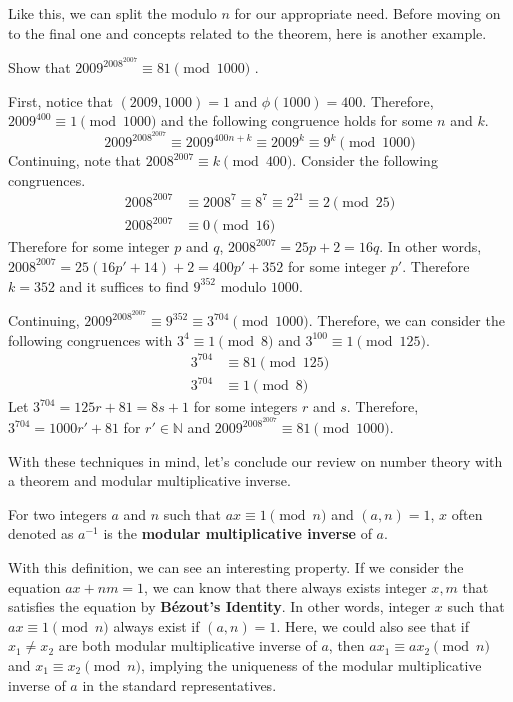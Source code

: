 \documentclass[../../../main.tex]{subfiles}
\begin{document}
Like this, we can split the modulo $n$ for our appropriate need.
Before moving on to the final one and concepts related to the
theorem, here is another example.

\begin{problem}{}{}
Show that $2009^{2008^{2007}} \equiv 81 \pmod{1000}$ \cite{MATH01-5}.
\end{problem}
\begin{solution}
First, notice that $(2009, 1000) = 1$ and $\phi(1000) = 400$.
Therefore, $2009^{400} \equiv 1 \pmod{1000}$ and the following
congruence holds for some $n$ and $k$.
\[
2009^{2008^{2007}}
\equiv 2009^{400n + k}
\equiv 2009^{k}
\equiv 9^k \pmod{1000}
\]
Continuing, note that $2008^{2007} \equiv k \pmod{400}$.
Consider the following congruences.
\begin{align*}
    2008^{2007} &\equiv 2008^7 \equiv 8^7 \equiv 2^{21}
        \equiv 2 \pmod{25} \\
    2008^{2007} &\equiv 0 \pmod{16}
\end{align*}
Therefore for some integer $p$ and $q$, $2008^{2007} = 25p + 2
= 16q$. In other words, $2008^{2007} = 25(16p' + 14) + 2
= 400p' + 352$ for some integer $p'$. Therefore $k = 352$ and
it suffices to find $9^{352}$ modulo $1000$.

Continuing, $2009^{2008^{2007}} \equiv 9^{352} \equiv 3^{704}
\pmod{1000}$. Therefore, we can consider the following congruences
with $3^4 \equiv 1 \pmod{8}$ and $3^{100} \equiv 1 \pmod{125}$.
\begin{align*}
    3^{704} &\equiv 81 \pmod{125} \\
    3^{704} &\equiv 1 \pmod{8}
\end{align*}
Let $3^{704} = 125r + 81 = 8s + 1$ for some integers $r$ and $s$.
Therefore, $3^{704} = 1000r' + 81$ for $r' \in \mathbb{N}$ and
$2009^{2008^{2007}} \equiv 81 \pmod{1000}$.
\end{solution}

With these techniques in mind, let's conclude our review on
number theory with a theorem and modular multiplicative inverse.

\begin{definition}{}{}
For two integers $a$ and $n$ such that $a x \equiv 1 \pmod{n}$
and $(a, n) = 1$, $x$ often denoted as $a^{-1}$ is the
\textbf{modular multiplicative inverse} of $a$.
\end{definition}

With this definition, we can see an interesting property.
If we consider the equation $ax + nm = 1$, we can know that there
always exists integer $x, m$ that satisfies the equation by
\textbf{Bézout's Identity}. In other words, integer $x$ such that
$ax \equiv 1 \pmod{n}$ always exist if $(a, n) = 1$. Here, we could
also see that if $x_1 \neq x_2$ are both modular multiplicative
inverse of $a$, then $ax_1 \equiv ax_2 \pmod{n}$ and
$x_1 \equiv x_2 \pmod{n}$, implying the uniqueness of the modular
multiplicative inverse of $a$ in the standard representatives.
\end{document}
